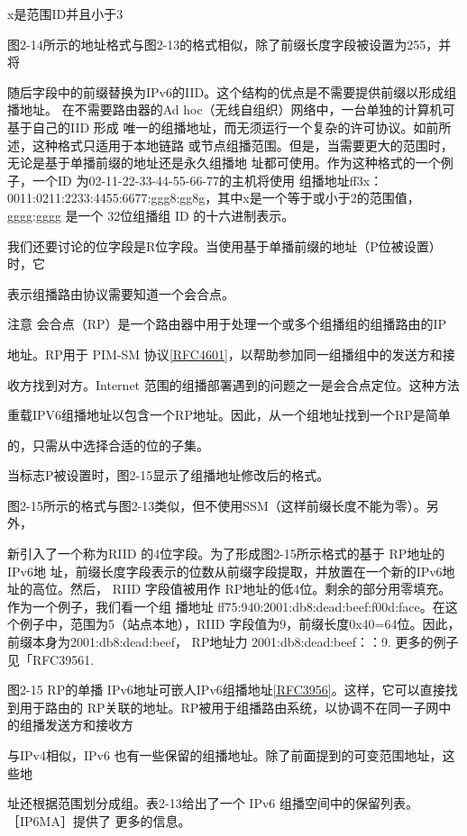 x是范围ID并且小于3

图2-14所示的地址格式与图2-13的格式相似，除了前缀长度字段被设置为255，并将

随后字段中的前缀替换为IPv6的IID。这个结构的优点是不需要提供前缀以形成组播地址。
在不需要路由器的Ad hoc（无线自组织）网络中，一台单独的计算机可基于自己的IID 形成
唯一的组播地址，而无须运行一个复杂的许可协议。如前所述，这种格式只适用于本地链路
或节点组播范围。但是，当需要更大的范围时，无论是基于单播前缀的地址还是永久组播地
址都可使用。作为这种格式的一个例子，一个ID 为02-11-22-33-44-55-66-77的主机将使用
组播地址ff3x：0011:0211:2233:4455:6677:ggg8:gg8g，其中x是一个等于或小于2的范围值，
gggg:gggg 是一个 32位组播组 ID 的十六进制表示。

我们还要讨论的位字段是R位字段。当使用基于单播前缀的地址（P位被设置）时，它

表示组播路由协议需要知道一个会合点。

注意 会合点（RP）是一个路由器中用于处理一个或多个组播组的组播路由的IP

地址。RP用于 PIM-SM 协议\href{https://www.rfc-editor.org/rfc/rfc4601}{[RFC4601]}，以帮助参加同一组播组中的发送方和接

收方找到对方。Internet 范围的组播部署遇到的问题之一是会合点定位。这种方法

重载IPV6组播地址以包含一个RP地址。因此，从一个组地址找到一个RP是简单

的，只需从中选择合适的位的子集。

当标志P被设置时，图2-15显示了组播地址修改后的格式。

图2-15所示的格式与图2-13类似，但不使用SSM（这样前缀长度不能为零）。另外，

新引入了一个称为RIID 的4位字段。为了形成图2-15所示格式的基于 RP地址的IPv6地
址，前缀长度字段表示的位数从前缀字段提取，并放置在一个新的IPv6地址的高位。然后，
RIID 字段值被用作 RP地址的低4位。剩余的部分用零填充。作为一个例子，我们看一个组
播地址 ff75:940:2001:db8:dead:beef:f00d:face。在这个例子中，范围为5（站点本地），RIID
字段值为9，前缀长度0x40=64位。因此，前缀本身为2001:db8:dead:beef， RP地址力
2001:db8:dead:beef：：9. 更多的例子见「RFC39561.


图2-15 RP的单播 IPv6地址可嵌人IPv6组播地址\href{https://www.rfc-editor.org/rfc/rfc3956}{[RFC3956]}。这样，它可以直接找到用于路由的
RP关联的地址。RP被用于组播路由系统，以协调不在同一子网中的组播发送方和接收方

与IPv4相似，IPv6 也有一些保留的组播地址。除了前面提到的可变范围地址，这些地

址还根据范围划分成组。表2-13给出了一个 IPv6 组播空间中的保留列表。［IP6MA］提供了
更多的信息。

